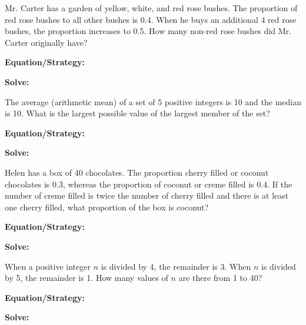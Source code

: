 \vfill
\newpage
\begin{multicols*}{2}
\begin{outline}[enumerate]
\medium

\1 Mr. Carter has a garden of yellow, white, and red rose bushes. The proportion of red rose bushes to all other bushes is 0.4. When he buys an additional 4 red rose bushes, the proportion increases to 0.5. How many non-red rose bushes did Mr. Carter originally have?

\bigskip
\textbf{Equation/Strategy:} \hrulefill

\bigskip
\textbf{Solve:}

\vfill
{}

\midline

\1 The average (arithmetic mean) of a set of 5 positive integers is 10 and the median is 10. What is the largest possible value of the largest member of the set?

\bigskip
\textbf{Equation/Strategy:} \hrulefill

\bigskip
\textbf{Solve:}

\vfill
{}

\columnbreak
\advanced

\1 Helen has a box of 40 chocolates. The proportion cherry filled or coconut chocolates is 0.3, whereas the proportion of coconut or creme filled is 0.4. If the number of creme filled is twice the number of cherry filled and there is at least one cherry filled, what proportion of the box is coconut?

\bigskip
\textbf{Equation/Strategy:} \hrulefill

\bigskip
\textbf{Solve:}

\vfill
{}

\midline

\1 When a positive integer $n$ is divided by 4, the remainder is 3. When $n$ is divided by 5, the remainder is 1. How many values of $n$ are there from 1 to 40?

\bigskip
\textbf{Equation/Strategy:} \hrulefill

\bigskip
\textbf{Solve:}

\vfill
{}
\end{outline}
\end{multicols*}